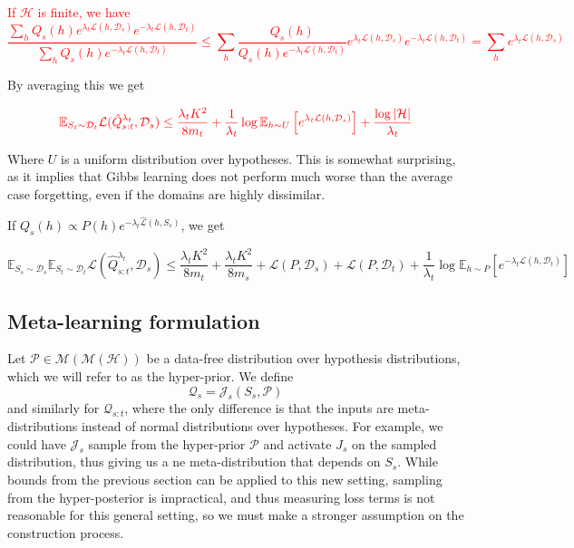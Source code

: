 \documentclass[letterpaper]{article}
\theoremstyle{definition}
\begin{document}
\textcolor{red}{If $\mathcal{H}$ is finite, we have 
$$\frac{\sum_h Q_s(h)e^{\lambda_t\mathcal{L}(h,\mathcal{D}_s)}e^{-\lambda_t\mathcal{L}(h,\mathcal{D}_t)}}{\sum_h Q_s(h)e^{-\lambda_t\mathcal{L}(h,\mathcal{D}_t)}}\leq 
\sum_h \frac{Q_s(h)}{Q_s(h)e^{-\lambda_t\mathcal{L}(h,\mathcal{D}_t)}}e^{\lambda_t\mathcal{L}(h,\mathcal{D}_s)}e^{-\lambda_t\mathcal{L}(h,\mathcal{D}_t)}=\sum_h{e^{\lambda_t\mathcal{L}(h,\mathcal{D}_s)}} $$}

By averaging this we get


\begin{equation} 
\textcolor{red}{\mathbb{E}_{S_t\sim \mathcal{D}_t}\mathcal{L}( \hat{Q}^{\lambda_t}_{s:t},\mathcal{D}_s)\leq \frac{\lambda_t K^2}{8m_t}+\frac{1}{\lambda_t}\log\mathbb{E}_{h\sim U}\left [e^{\lambda_t\mathcal{L}(h,\mathcal{D}_s)}\right ] + \frac{\log |\mathcal{H}|}{\lambda_t}}
\end{equation}

Where $U$ is a uniform distribution over hypotheses. This is somewhat surprising, as it implies that Gibbs learning does not perform much worse than the average case forgetting, even if the domains are highly dissimilar.

If $Q_s(h)\propto P(h)e^{-\lambda_t\hat{\mathcal{L}}(h,S_s)}$, we get 

\begin{equation} 
\mathbb{E}_{S_s\sim \mathcal{D}_s}\mathbb{E}_{S_t\sim \mathcal{D}_t}\mathcal{L}( \hat{Q}^{\lambda_t}_{s:t},\mathcal{D}_s)\leq \frac{\lambda_t K^2}{8m_t}+\frac{\lambda_t K^2}{8m_s}+\mathcal{L}(P,\mathcal{D}_s)+\mathcal{L}(P,\mathcal{D}_t) +\frac{1}{\lambda_t}\log\mathbb{E}_{h\sim P}\left [e^{-\lambda_t\mathcal{L}(h,\mathcal{D}_t)} \right ]
\end{equation}

\subsection{Meta-learning formulation}

Let $\mathcal{P}\in\mathcal{M}(\mathcal{M}(\mathcal{H}))$ be a data-free distribution over hypothesis distributions, which we will refer to as the hyper-prior. We define 
$$\mathcal{Q}_s=\mathcal{J}_s(S_s,\mathcal{P})$$ and similarly for $\mathcal{Q}_{s:t}$, where the only difference is that the inputs are meta-distributions instead of normal distributions over hypotheses. For example, we could have $\mathcal{J}_s$ sample from the hyper-prior $\mathcal{P}$ and activate $J_s$ on the sampled distribution, thus giving us a ne meta-distribution that depends on $S_s$. While bounds from the previous section can be applied to this new setting, sampling from the hyper-posterior is impractical, and thus measuring loss terms is not reasonable for this general setting, so we must make a stronger assumption on the construction process.
\end{document}
